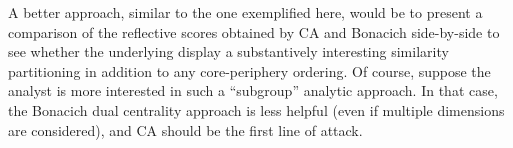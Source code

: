 \documentclass[a4paper,fleqn]{cas-sc}
\begin{document}
A better approach, similar to the one exemplified here, would be to present a comparison of the reflective scores obtained by CA and Bonacich side-by-side to see whether the underlying display a substantively interesting similarity partitioning in addition to any core-periphery ordering. Of course, suppose the analyst is more interested in such a ``subgroup'' analytic approach. In that case, the Bonacich dual centrality approach is less helpful (even if multiple dimensions are considered), and CA should be the first line of attack. 



%


\end{document}

